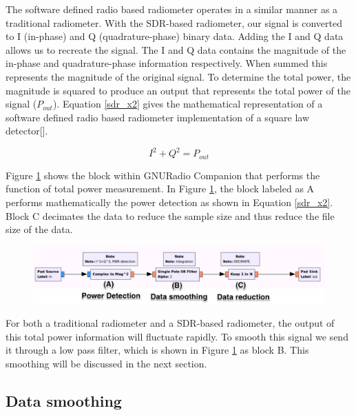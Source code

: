 The software defined radio based radiometer operates in a similar manner as a traditional radiometer.  With the SDR-based radiometer, our signal is converted to I (in-phase) and Q (quadrature-phase) binary data.  Adding the I and Q data allows us to recreate the signal.  The I and Q data contains the magnitude of the in-phase and quadrature-phase information respectively.  When summed this represents the magnitude of the original signal.  To determine the total power, the magnitude is squared to produce an output that represents the total power of the signal ($P_{out}$).  Equation \ref{sdr_x2} gives the mathematical representation of a software defined radio based radiometer implementation of a square law detector[\cite{Rashid}]. 

\begin{equation}\label{sdr_x2}
I^2+Q^2 = P_{out}
\end{equation}

Figure \ref{square_block} shows the block within GNURadio Companion that performs the function of total power measurement.  In Figure \ref{square_block}, the block labeled as A performs mathematically the power detection as shown in Equation \ref{sdr_x2}.  Block C decimates the data to reduce the sample size and thus reduce the file size of the data.  

{\begin{figure}[h!tb] 
\centering
\includegraphics[width=17cm]{Images/TPR_grc.pdf}
\label{square_block}
\end{figure}
}

For both a traditional radiometer and a SDR-based radiometer, the output of this total power information will fluctuate rapidly.  To smooth this signal we send it through a low pass filter, which is shown in Figure \ref{square_block} as block B.  This smoothing will be discussed in the next section.

\subsection{Data smoothing}\label{smoothing}

